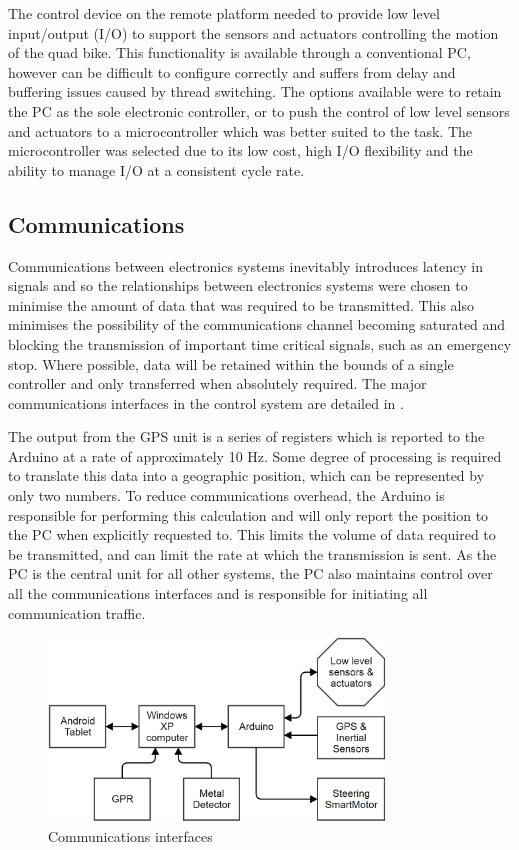 \documentclass[main.tex]{subfiles}
\begin{document}
The control device on the remote platform needed to provide low level input/output (I/O) to support the sensors and actuators controlling the motion of the quad bike. This functionality is available through a conventional PC, however can be difficult to configure correctly and suffers from delay and buffering issues caused by thread switching. The options available were to retain the PC as the sole electronic controller, or to push the control of low level sensors and actuators to a microcontroller which was better suited to the task. The microcontroller was selected due to its low cost, high I/O flexibility and the ability to manage I/O at a consistent cycle rate. 


\subsection{Communications}
Communications between electronics systems inevitably introduces latency in signals and so the relationships between electronics systems were chosen to minimise the amount of data that was required to be transmitted. This also minimises the possibility of the communications channel becoming saturated and blocking the transmission of important time critical signals, such as an emergency stop. Where possible, data will be retained within the bounds of a single controller and only transferred when absolutely required. The major communications interfaces in the control system are detailed in .

The output from the GPS unit is a series of registers which is reported to the Arduino at a rate of approximately 10 Hz. Some degree of processing is required to translate this data into a geographic position, which can be represented by only two numbers. To reduce communications overhead, the Arduino is responsible for performing this calculation and will only report the position to the PC when explicitly requested to. This limits the volume of data required to be transmitted, and can limit the rate at which the transmission is sent. As the PC is the central unit for all other systems, the PC also maintains control over all the communications interfaces and is responsible for initiating all communication traffic.

\begin{figure}[ht]
\includegraphics[width=0.8\textwidth]{3-ConceptDesign/communications.png}
\centering
\caption{Communications interfaces} 
\end{figure}
\end{document}
